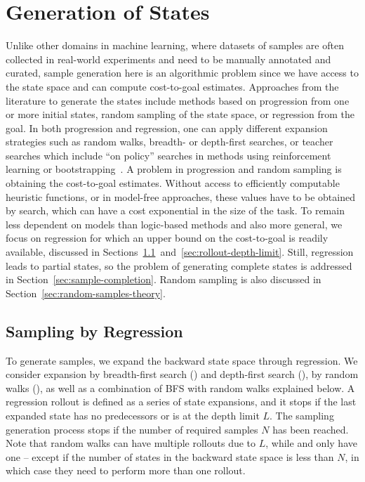 \section{Generation of States}
\label{sec:generation}

Unlike other domains in machine learning, where datasets of samples are often collected in real-world experiments and need to be manually annotated and curated, sample generation here is an algorithmic problem since we have access to the state space and can compute cost-to-goal estimates. Approaches from the literature to generate the states include methods based on progression from one or more initial states, random sampling of the state space, or regression from the goal. In both progression and regression, one can apply different expansion strategies such as random walks, breadth- or depth-first searches, or teacher searches which include ``on policy'' searches in methods using reinforcement learning or bootstrapping~\cite{Arfaee.etal/2011}. A problem in progression and random sampling is obtaining the cost-to-goal estimates. Without access to efficiently computable heuristic functions, or in model-free approaches, these values have to be obtained by search, which can have a cost exponential in the size of the task. To remain less dependent on models than logic-based methods and also more general, we focus on regression for which an upper bound on the cost-to-goal is readily available, discussed in Sections~\ref{sec:sampling-generation}~and~\ref{sec:rollout-depth-limit}. Still, regression leads to partial states, so the problem of generating complete states is addressed in Section~\ref{sec:sample-completion}. Random sampling is also discussed in Section~\ref{sec:random-samples-theory}.

\subsection{Sampling by Regression}
\label{sec:sampling-generation}

To generate samples, we expand the backward state space through regression. We consider expansion by breadth-first search (\bfs) and depth-first search (\dfs), by random walks (\rw), as well as a combination of BFS with random walks explained below. A regression rollout is defined as a series of state expansions, and it stops if the last expanded state has no predecessors or is at the depth limit $L$. The sampling generation process stops if the number of required samples $N$ has been reached. Note that random walks can have multiple rollouts due to $L$, while \bfs and \dfs only have one -- except if the number of states in the backward state space is less than $N$, in which case they need to perform more than one rollout.

